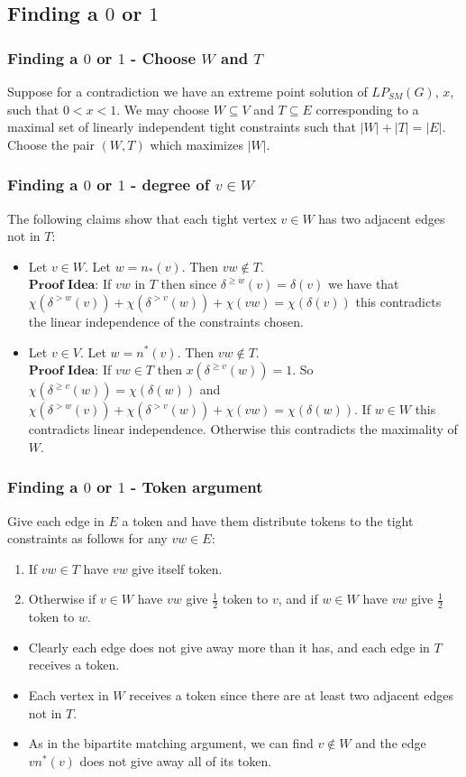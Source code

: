 \documentclass{beamer}
\begin{document}
\subsection{Finding a $0$ or $1$}
\begin{frame}
\frametitle{Finding a $0$ or $1$ - Choose $W$ and $T$}
Suppose for a contradiction we have an extreme point solution of $LP_{SM}(G)$, $x$, such that $0 < x < 1$. We may choose $W \subseteq V$ and $T \subseteq E$ corresponding to a maximal set of linearly independent tight constraints such that $|W| + |T| = |E|$. Choose the pair $(W,T)$ which  maximizes $|W|$.\\
\end{frame}
\begin{frame}
\frametitle{Finding a $0$ or $1$ - degree of $v \in W$}
The following claims show that each tight vertex $v \in W$ has two adjacent edges not in $T$:
\begin{itemize}
\item<2-> Let $v \in W$.  Let $w = n_*(v)$. Then $vw \not\in T$. \\
$\textbf{Proof Idea:}$ If $vw$ in $T$ then since $\delta^{\geq w}(v) = \delta(v)$ we have that $\chi(\delta^{>w}(v)) + \chi(\delta^{>v}(w)) + \chi(vw) = \chi(\delta(v))$ this contradicts the linear independence of the constraints chosen.
\item<3-> Let $v \in V$. Let $w = n^*(v)$. Then $vw \not\in T$. \\
$\textbf{Proof Idea:}$ If $vw \in T$ then $x(\delta^{\geq v}(w)) = 1$. So $\chi(\delta^{\geq v}(w)) = \chi(\delta(w))$ and $\chi(\delta^{>w}(v)) + \chi(\delta^{>v}(w)) + \chi(vw) = \chi(\delta(w)).$ If $w \in W$ this contradicts linear independence. Otherwise this contradicts the maximality of $W$.
\end{itemize}
\end{frame}
\begin{frame}
\frametitle{Finding a $0$ or $1$ - Token argument}
Give each edge in $E$ a token and have them distribute tokens to the tight constraints as follows for any $vw \in E$:
\begin{enumerate}
\item If $vw \in T$ have $vw$ give itself token.
\item Otherwise if $v \in W$ have $vw$ give $\frac{1}{2}$ token to $v$, and if $w \in W$ have $vw$ give $\frac{1}{2}$ token to $w$.
\end{enumerate}
\begin{itemize}
\item<2-> Clearly each edge does not give away more than it has, and each edge in $T$ receives a token.
\item<3-> Each vertex in $W$ receives a token since there are at least two adjacent edges not in $T$. 
\item<4-> As in the bipartite matching argument, we can find $v \not\in W$ and the edge $vn^*(v)$ does not give away all of its token. 
\end{itemize}
\end{frame}
\end{document}
